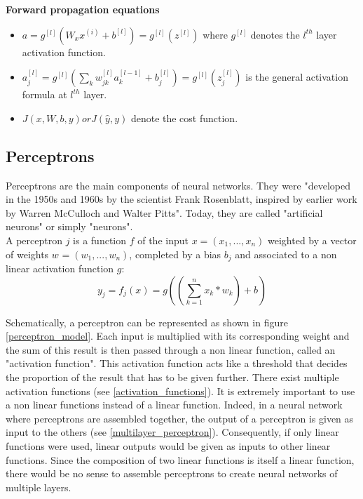 \noindent \textbf{Forward propagation equations}
\begin{itemize}
\item $a = g^{[l]}(W_{x}x^{(i)} + b^{[l]}) = g^{[l]}(z^{[l]})$ where $g^{[l]}$ denotes the $l^{th}$ layer activation function.
\item $a_{j}^{[l]} = g^{[l]} (\sum_{k} w_{jk}^{[l]}a_{k}^{[l-1]} + b_{j}^{[l]}) = g^{[l]} (z_{j}^{[l]}) $ is the general activation formula at $l^{th}$ layer.
\item $J(x, W, b, y) or J(\hat{y}, y)$ denote the cost function.
\end{itemize}

\subsection{Perceptrons}
\label{perceptron}
Perceptrons are the main components of neural networks. They were "developed in the 1950s and 1960s by the scientist Frank Rosenblatt, inspired by earlier work by Warren McCulloch and Walter Pitts"\cite{13}. Today, they are called "artificial neurons" or simply "neurons".\\
A perceptron $j$ is a function $f$ of the input $x=(x_{1}, ..., x_{n})$ weighted by a vector of weights $w_{}=(w_{1}, ..., w_{n})$, completed by a bias $b_{j}$ and associated to a non linear activation function $g$:
\begin{equation}
y_{j} = f_{j}(x) = g((\sum_{k=1}^{n} x_{k} * w_{k}) + b_{})
\end{equation}

Schematically, a perceptron can be represented as shown in figure \ref{perceptron_model}. Each input is multiplied with its corresponding weight and the sum of this result is then passed through a non linear function, called an "activation function". This activation function acts like a threshold that decides the proportion of the result that has to be given further. There exist multiple activation functions (see \ref{activation_functions}). It is extremely important to use a non linear functions instead of a linear function. Indeed, in a neural network where perceptrons are assembled together, the output of a perceptron is given as input to the others (see \ref{multilayer_perceptron}). Consequently, if only linear functions were used, linear outputs would be given as inputs to other linear functions. Since the composition of two linear functions is itself a linear function, there would be no sense to assemble perceptrons to create neural networks of multiple layers.


